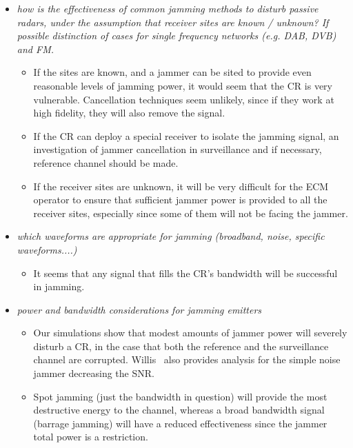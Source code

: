 \documentclass[english, 12pt]{report}
\begin{document}
\begin{itemize}
\item\emph{ how is the effectiveness of common jamming methods to disturb passive radars, under the assumption that receiver sites are known / unknown? If possible distinction of cases for single frequency networks (e.g. DAB, DVB) and FM.}
\begin{itemize}
\item  If the sites are known, and a jammer can be sited to provide even reasonable levels of jamming power, it would seem that the CR is very vulnerable. Cancellation techniques seem unlikely, since if they work at high fidelity, they will also remove the signal.
\item If the CR can deploy a special receiver to isolate the jamming signal, an investigation of jammer cancellation in surveillance and if necessary, reference channel should be made.
\item If the receiver sites are unknown, it will be very difficult for the ECM operator to ensure that sufficient jammer power is provided to all the receiver sites, especially since some of them will not be facing the jammer.
\end{itemize}
\end{itemize}

\begin{itemize}
\item \emph{which waveforms are appropriate for jamming (broadband, noise, specific waveforms....)}
\begin{itemize}
\item It seems that any signal that fills the CR's bandwidth will be successful in jamming. 
\end{itemize}
\end{itemize}

\begin{itemize}
\item \emph{power and bandwidth considerations for jamming emitters}
\begin{itemize}
\item Our simulations show that modest amounts of jammer power will severely disturb a CR, in the case that both the reference and the surveillance channel are corrupted. Willis~\cite{willis:05, willis:07} also provides analysis for the simple noise jammer decreasing the SNR.
\item Spot jamming (just the bandwidth in question) will provide the most destructive energy to the channel, whereas a broad bandwidth signal (barrage jamming) will have a reduced effectiveness since the jammer total power is a restriction.
\end{itemize}
\end{itemize}
\end{document}
